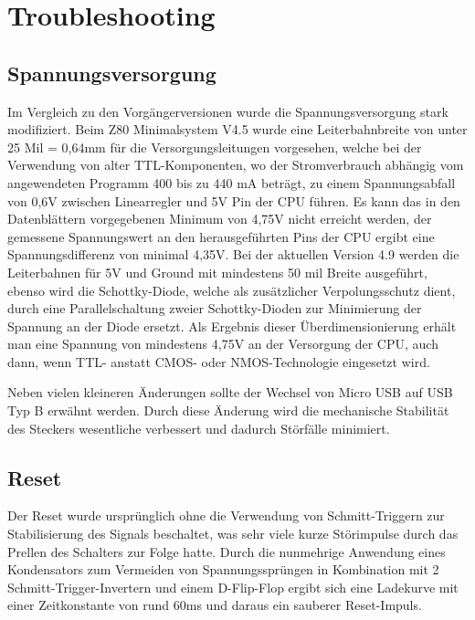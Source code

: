 \section{Troubleshooting}
\label{sec:z80-troubleshooting}
\subsection{Spannungsversorgung}
Im Vergleich zu den Vorgängerversionen wurde die Spannungsversorgung stark modifiziert. Beim Z80 Minimalsystem V4.5 wurde eine Leiterbahnbreite von unter 25 Mil = 0,64mm für die Versorgungsleitungen vorgesehen, welche bei der Verwendung von alter TTL-Komponenten, wo der Stromverbrauch abhängig vom angewendeten Programm 400 bis zu 440 mA beträgt, zu einem Spannungsabfall von 0,6V zwischen Linearregler und 5V Pin der CPU führen. Es kann das in den Datenblättern vorgegebenen Minimum von 4,75V nicht erreicht werden, der gemessene Spannungswert an den herausgeführten Pins der CPU ergibt eine Spannungsdifferenz von minimal 4,35V. Bei der aktuellen Version 4.9 werden die Leiterbahnen für 5V und Ground mit mindestens 50 mil Breite ausgeführt, ebenso wird die Schottky-Diode, welche als zusätzlicher Verpolungsschutz dient, durch eine Parallelschaltung zweier Schottky-Dioden zur Minimierung der Spannung an der Diode ersetzt. Als Ergebnis dieser Überdimensionierung erhält man eine Spannung von mindestens 4,75V an der Versorgung der CPU, auch dann, wenn TTL- anstatt CMOS- oder NMOS-Technologie eingesetzt wird.

Neben vielen kleineren Änderungen sollte der Wechsel von Micro USB auf USB Typ B erwähnt werden. Durch diese Änderung wird die mechanische Stabilität des Steckers wesentliche verbessert und dadurch Störfälle minimiert.

\subsection{Reset}
Der Reset wurde ursprünglich ohne die Verwendung von Schmitt-Triggern zur Stabilisierung des Signals beschaltet, was sehr viele kurze Störimpulse durch das Prellen des Schalters zur Folge hatte. Durch die nunmehrige Anwendung eines Kondensators zum Vermeiden von Spannungssprüngen in Kombination mit 2 Schmitt-Trigger-Invertern und einem D-Flip-Flop ergibt sich eine Ladekurve mit einer Zeitkonstante von rund 60ms und daraus ein sauberer Reset-Impuls.


